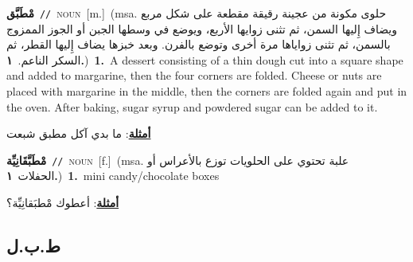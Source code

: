 \documentclass[10pt,a4paper,twoside]{article} %
\begin{document}
\begin{multicols}{2}
{\setlength\topsep{0pt}\textbf{\foreignlanguage{arabic}{مْطَبَّق}}\ {\color{gray}\texttt{//}\color{black}}\ \textsc{noun}\ [m.]\ \color{gray}(msa. \foreignlanguage{arabic}{حلوى مكونة من عجينة رقيقة مقطعة على شكل مربع ويضاف إِليها السمن، ثم تثنى زوايها الأربع، ويوضع في وسطها الجبن أو الجوز الممزوج بالسمن، ثم تثنى زواياها مرة أخرى وتوضع بالفرن. وبعد خبزها يضاف إِليها القطر، ثم السكر الناعم.}~\foreignlanguage{arabic}{\textbf{١.}})\color{black}\ \textbf{1.}~A dessert consisting of a thin dough cut into a square shape and added to margarine, then the four corners are folded. Cheese or nuts are placed with margarine in the middle, then the corners are folded again and put in the oven. After baking, sugar syrup and powdered sugar can be added to it.\  \begin{flushright}\color{gray}\foreignlanguage{arabic}{\textbf{\underline{\foreignlanguage{arabic}{أمثلة}}}: ما بدي آكل مطبق شبعت}\end{flushright}\color{black}} \vspace{2mm}

{\setlength\topsep{0pt}\textbf{\foreignlanguage{arabic}{مْطَبَّقَانِيِّة}}\ {\color{gray}\texttt{//}\color{black}}\ \textsc{noun}\ [f.]\ \color{gray}(msa. \foreignlanguage{arabic}{علبة تحتوي على الحلويات توزع بالأعراس أو الحفلات}~\foreignlanguage{arabic}{\textbf{١.}})\color{black}\ \textbf{1.}~mini candy/chocolate boxes\  \begin{flushright}\color{gray}\foreignlanguage{arabic}{\textbf{\underline{\foreignlanguage{arabic}{أمثلة}}}: أعطوك مْطبَقانِيِّة؟}\end{flushright}\color{black}} \vspace{2mm}

\vspace{-3mm}
\subsection*{\color{blue}\foreignlanguage{arabic}{ط.ب.ل}\color{blue}{}} 


\end{multicols}
\end{document}
